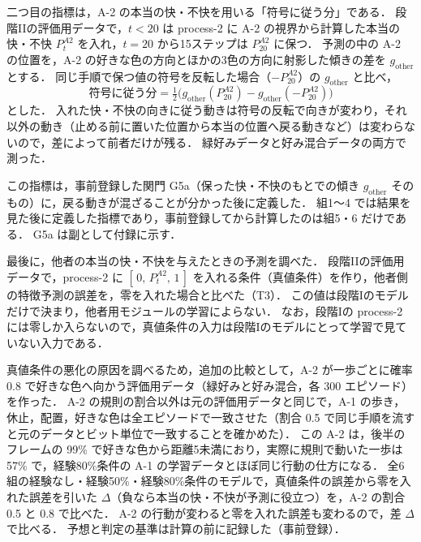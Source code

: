 二つ目の指標は，A-2 の本当の快・不快を用いる「符号に従う分」である．
段階IIの評価用データで，$t<20$ は process-2 に A-2 の視界から計算した本当の快・不快 $P^{A2}_t$ を入れ，$t=20$ から15ステップは $P^{A2}_{20}$ に保つ．
予測の中の A-2 の位置を，A-2 の好きな色の方向とほかの3色の方向に射影した傾きの差を $g_{\mathrm{other}}$ とする．
同じ手順で保つ値の符号を反転した場合（$-P^{A2}_{20}$）の $g_{\mathrm{other}}$ と比べ，
\begin{equation}
  \text{符号に従う分} = \tfrac{1}{2}\bigl(g_{\mathrm{other}}(P^{A2}_{20}) - g_{\mathrm{other}}(-P^{A2}_{20})\bigr)
\end{equation}
とした．
入れた快・不快の向きに従う動きは符号の反転で向きが変わり，それ以外の動き（止める前に置いた位置から本当の位置へ戻る動きなど）は変わらないので，差によって前者だけが残る．
緑好みデータと好み混合データの両方で測った．

この指標は，事前登録した関門 G5a（保った快・不快のもとでの傾き $g_{\mathrm{other}}$ そのもの）に，戻る動きが混ざることが分かった後に定義した．
組1〜4 では結果を見た後に定義した指標であり，事前登録してから計算したのは組5・6 だけである．
G5a は副として付録に示す．

最後に，他者の本当の快・不快を与えたときの予測を調べた．
段階IIの評価用データで，process-2 に $[\,0,\,P^{A2}_t,\,1\,]$ を入れる条件（真値条件）を作り，他者側の特徴予測の誤差を，零を入れた場合と比べた（T3）．
この値は段階Iのモデルだけで決まり，他者用モジュールの学習によらない．
なお，段階Iの process-2 には零しか入らないので，真値条件の入力は段階Iのモデルにとって学習で見ていない入力である．

真値条件の悪化の原因を調べるため，追加の比較として，A-2 が一歩ごとに確率 0.8 で好きな色へ向かう評価用データ（緑好みと好み混合，各 300 エピソード）を作った．
A-2 の規則の割合以外は元の評価用データと同じで，A-1 の歩き，休止，配置，好きな色は全エピソードで一致させた（割合 0.5 で同じ手順を流すと元のデータとビット単位で一致することを確かめた）．
この A-2 は，後半のフレームの 99\% で好きな色から距離5未満におり，実際に規則で動いた一歩は 57\% で，経験80\%条件の A-1 の学習データとほぼ同じ行動の仕方になる．
全6組の経験なし・経験50\%・経験80\%条件のモデルで，真値条件の誤差から零を入れた誤差を引いた $\Delta$（負なら本当の快・不快が予測に役立つ）を，A-2 の割合 0.5 と 0.8 で比べた．
A-2 の行動が変わると零を入れた誤差も変わるので，差 $\Delta$ で比べる．
予想と判定の基準は計算の前に記録した（事前登録）．

